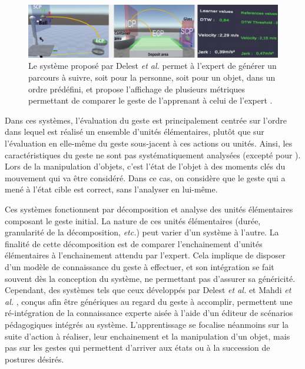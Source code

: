 \begin{figure}
    \centering
    \includegraphics[width=\textwidth]{pictures/Delest_system.png}
    \caption[EVAH permettant de générer des parcours à suivre pour un objet ou l'apprenant \parencite{Delest2019MaE}]{Le système proposé par Delest \textit{et al.} permet à l'expert de générer un parcours à suivre, soit pour la personne, soit pour un objet, dans un ordre prédéfini, et propose l'affichage de plusieurs métriques permettant de comparer le geste de l'apprenant à celui de l'expert \parencite{Delest2019MaE}.}
    \label{fig:Delest_system}
\end{figure}

Dans ces systèmes, l'évaluation du geste est principalement centrée sur l'ordre dans lequel est réalisé un ensemble d'unités élémentaires, plutôt que sur l'évaluation en elle-même du geste sous-jacent à ces actions ou unités. Ainsi, les caractéristiques du geste ne sont pas systématiquement analysées (excepté pour \parencite{Delest2019MaE}). Lors de la manipulation d'objets, c'est l'état de l'objet à des moments clés du mouvement qui va être considéré. Dans ce cas, on considère que le geste qui a mené à l'état cible est correct, sans l'analyser en lui-même.

Ces systèmes fonctionnent par décomposition et analyse des unités élémentaires composant le geste initial. La nature de ces unités élémentaires (durée, granularité de la décomposition, \textit{etc.}) peut varier d'un système à l'autre. La finalité de cette décomposition est de comparer l'enchainement d'unités élémentaires à l'enchainement attendu par l'expert. Cela implique de disposer d'un modèle de connaissance du geste à effectuer, et son intégration se fait souvent dès la conception du système, ne permettant pas d'assurer sa généricité. Cependant, des systèmes tels que ceux développés par Delest \textit{et al.} \parencite{Delest2019MaE} et Mahdi \textit{et al.} \parencite{Mahdi2019TaE}, conçus afin être génériques au regard du geste à accomplir, permettent une ré-intégration de la connaissance experte aisée à l'aide d'un éditeur de scénarios pédagogiques intégrés au système. L'apprentissage se focalise néanmoins sur la suite d'action à réaliser, leur enchainement et la manipulation d'un objet, mais pas sur les gestes qui permettent d'arriver aux états ou à la succession de postures désirés.


